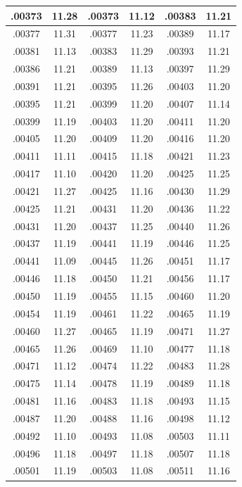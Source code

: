 \documentclass[10pt,twoside]{report}
\begin{document}
\begin{appendices}
\begin{longtable}{|c|c||c|c||c|c|}
.00373 & 11.28 & .00373 & 11.12 & .00383 & 11.21\\\hline
.00377 & 11.31 & .00377 & 11.23 & .00389 & 11.17\\\hline
.00381 & 11.13 & .00383 & 11.29 & .00393 & 11.21\\\hline
.00386 & 11.21 & .00389 & 11.13 & .00397 & 11.29\\\hline
.00391 & 11.21 & .00395 & 11.26 & .00403 & 11.20\\\hline
.00395 & 11.21 & .00399 & 11.20 & .00407 & 11.14\\\hline
.00399 & 11.19 & .00403 & 11.20 & .00411 & 11.20\\\hline
.00405 & 11.20 & .00409 & 11.20 & .00416 & 11.20\\\hline
.00411 & 11.11 & .00415 & 11.18 & .00421 & 11.23\\\hline
.00417 & 11.10 & .00420 & 11.20 & .00425 & 11.25\\\hline
.00421 & 11.27 & .00425 & 11.16 & .00430 & 11.29\\\hline
.00425 & 11.21 & .00431 & 11.20 & .00436 & 11.22\\\hline
.00431 & 11.20 & .00437 & 11.25 & .00440 & 11.26\\\hline
.00437 & 11.19 & .00441 & 11.19 & .00446 & 11.25\\\hline
.00441 & 11.09 & .00445 & 11.26 & .00451 & 11.17\\\hline
.00446 & 11.18 & .00450 & 11.21 & .00456 & 11.17\\\hline
.00450 & 11.19 & .00455 & 11.15 & .00460 & 11.20\\\hline
.00454 & 11.19 & .00461 & 11.22 & .00465 & 11.19\\\hline
.00460 & 11.27 & .00465 & 11.19 & .00471 & 11.27\\\hline
.00465 & 11.26 & .00469 & 11.10 & .00477 & 11.18\\\hline
.00471 & 11.12 & .00474 & 11.22 & .00483 & 11.28\\\hline
.00475 & 11.14 & .00478 & 11.19 & .00489 & 11.18\\\hline
.00481 & 11.16 & .00483 & 11.18 & .00493 & 11.15\\\hline
.00487 & 11.20 & .00488 & 11.16 & .00498 & 11.12\\\hline
.00492 & 11.10 & .00493 & 11.08 & .00503 & 11.11\\\hline
.00496 & 11.18 & .00497 & 11.18 & .00507 & 11.18\\\hline
.00501 & 11.19 & .00503 & 11.08 & .00511 & 11.16\\\hline

\end{longtable}
\end{appendices}
\end{document}
